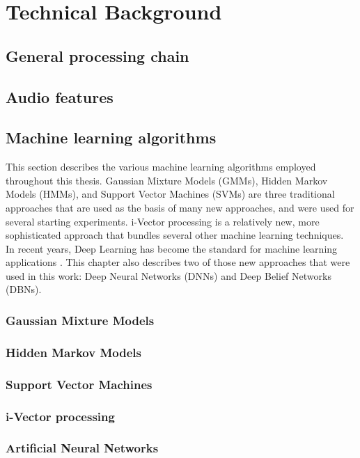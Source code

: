 \chapter{Technical Background}	\label{chap:background}
\section{General processing chain}
\section{Audio features}
\section{Machine learning algorithms}
This section describes the various machine learning algorithms employed throughout this thesis. Gaussian Mixture Models (GMMs), Hidden Markov Models (HMMs), and Support Vector Machines (SVMs) are three traditional approaches that are used as the basis of many new approaches, and were used for several starting experiments. i-Vector processing is a relatively new, more sophisticated approach that bundles several other machine learning techniques.\\
In recent years, Deep Learning has become the standard for machine learning applications \cite{}. This chapter also describes two of those new approaches that were used in this work: Deep Neural Networks (DNNs) and Deep Belief Networks (DBNs).

\subsection{Gaussian Mixture Models}
\subsection{Hidden Markov Models}
\subsection{Support Vector Machines}
\subsection{i-Vector processing}
\subsection{Artificial Neural Networks}
